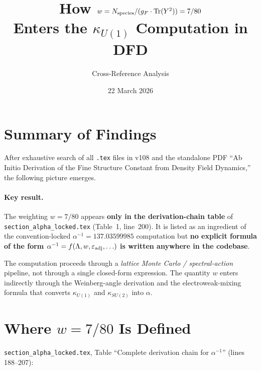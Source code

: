 \documentclass[11pt]{article}
\begin{document}
\title{How $w = N_{\rm species}/(g_F \cdot \mathrm{Tr}(Y^2)) = 7/80$\\
Enters the $\kappa_{U(1)}$ Computation in DFD}
\author{Cross-Reference Analysis}
\date{22 March 2026}
\maketitle

\section{Summary of Findings}

After exhaustive search of all \texttt{.tex} files in v108 and the standalone
PDF ``Ab Initio Derivation of the Fine Structure Constant from Density Field
Dynamics,'' the following picture emerges.

\paragraph{Key result.}
The weighting $w = 7/80$ appears \textbf{only in the derivation-chain table}
of \texttt{section\_alpha\_locked.tex} (Table~1, line~200). It is listed as an
ingredient of the convention-locked $\alpha^{-1} = 137.03599985$ computation
but \textbf{no explicit formula of the form
$\alpha^{-1} = f(\Lambda, w, \varepsilon_{\rm adj}, \ldots)$
is written anywhere in the codebase}.

The computation proceeds through a \emph{lattice Monte Carlo / spectral-action}
pipeline, not through a single closed-form expression.  The quantity $w$
enters indirectly through the Weinberg-angle derivation and the
electroweak-mixing formula that converts $\kappa_{U(1)}$ and $\kappa_{SU(2)}$
into $\alpha$.

\section{Where $w = 7/80$ Is Defined}

\texttt{section\_alpha\_locked.tex}, Table ``Complete derivation chain for
$\alpha^{-1}$'' (lines 188--207):
\end{document}
